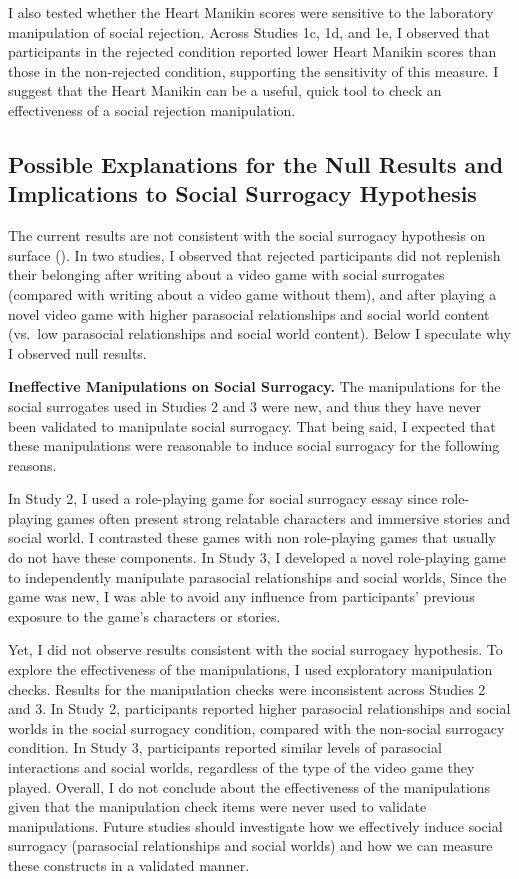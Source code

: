 \documentclass[
]{udthesis}
\begin{document}
I also tested whether the Heart Manikin scores were sensitive to the
laboratory manipulation of social rejection. Across Studies 1c, 1d, and
1e, I observed that participants in the rejected condition reported
lower Heart Manikin scores than those in the non-rejected condition,
supporting the sensitivity of this measure. I suggest that the Heart
Manikin can be a useful, quick tool to check an effectiveness of a
social rejection manipulation.

\subsection{Possible Explanations for the Null Results and Implications to Social Surrogacy Hypothesis}\label{possible-explanations-for-the-null-results-and-implications-to-social-surrogacy-hypothesis}

The current results are not consistent with the social surrogacy
hypothesis on surface (). In two studies, I observed that
rejected participants did not replenish their belonging after writing
about a video game with social surrogates (compared with writing about a
video game without them), and after playing a novel video game with
higher parasocial relationships and social world content (vs.~low
parasocial relationships and social world content). Below I speculate
why I observed null results.

\textbf{Ineffective Manipulations on Social Surrogacy.} The manipulations for
the social surrogates used in Studies 2 and 3 were new, and thus they
have never been validated to manipulate social surrogacy. That being
said, I expected that these manipulations were reasonable to induce
social surrogacy for the following reasons.

In Study 2, I used a role-playing game for social surrogacy essay since
role-playing games often present strong relatable characters and
immersive stories and social world. I contrasted these games with non
role-playing games that usually do not have these components. In Study
3, I developed a novel role-playing game to independently manipulate
parasocial relationships and social worlds, Since the game was new, I
was able to avoid any influence from participants' previous exposure to
the game's characters or stories.

Yet, I did not observe results consistent with the social surrogacy
hypothesis. To explore the effectiveness of the manipulations, I used
exploratory manipulation checks. Results for the manipulation checks
were inconsistent across Studies 2 and 3. In Study 2, participants
reported higher parasocial relationships and social worlds in the social
surrogacy condition, compared with the non-social surrogacy condition.
In Study 3, participants reported similar levels of parasocial
interactions and social worlds, regardless of the type of the video game
they played. Overall, I do not conclude about the effectiveness of the
manipulations given that the manipulation check items were never used to
validate manipulations. Future studies should investigate how we
effectively induce social surrogacy (parasocial relationships and social
worlds) and how we can measure these constructs in a validated manner.
\end{document}
